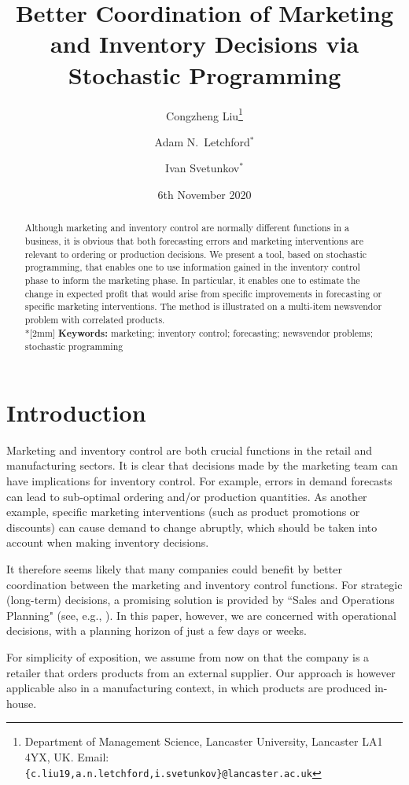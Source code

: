 \documentclass[a4paper,11pt]{article}
\title{Better Coordination of Marketing and Inventory Decisions via
Stochastic Programming}
\author{Congzheng Liu\thanks{Department of Management Science,
Lancaster University, Lancaster LA1 4YX, UK.
Email: {\tt \{c.liu19,a.n.letchford,i.svetunkov\}@lancaster.ac.uk}}
\and Adam N.\ Letchford$^*$ \and Ivan Svetunkov$^*$} %
\date{6th November 2020}
\begin{document}
\maketitle

\begin{abstract}
Although marketing and inventory control are normally different functions
in a business, it is obvious that both forecasting errors and marketing
interventions are relevant to ordering or production decisions. We present
a tool, based on stochastic programming, that enables one to use
information gained in the inventory control phase to inform the marketing
phase. In particular, it enables one to estimate the change in expected
profit that would arise from specific improvements in forecasting or
specific marketing interventions. The method is illustrated on a
multi-item newsvendor problem with correlated products.
\\*[2mm]
{\bf Keywords:} marketing; inventory control; forecasting; newsvendor problems; stochastic programming
\end{abstract}

\section{Introduction}

Marketing and inventory control are both crucial functions in the retail
and manufacturing sectors. It is clear that decisions made by the
marketing team can have implications for inventory control. For example,
errors in demand forecasts can lead to sub-optimal ordering and/or
production quantities. As another example, specific marketing interventions
(such as product promotions or discounts) can cause demand to change
abruptly, which should be taken into account when making inventory
decisions.

It therefore seems likely that many companies could benefit by better
coordination between the marketing and inventory control functions. For
strategic (long-term) decisions, a promising solution is provided by
``Sales and Operations Planning" (see, e.g., \cite{KS14,Th12}). In this
paper, however, we are concerned with operational decisions, with a
planning horizon of just a few days or weeks.

For simplicity of exposition, we assume from now on that the company is a retailer that orders products from an external supplier. Our approach
is however applicable also in a manufacturing context, in which products
are produced in-house.
\end{document}

